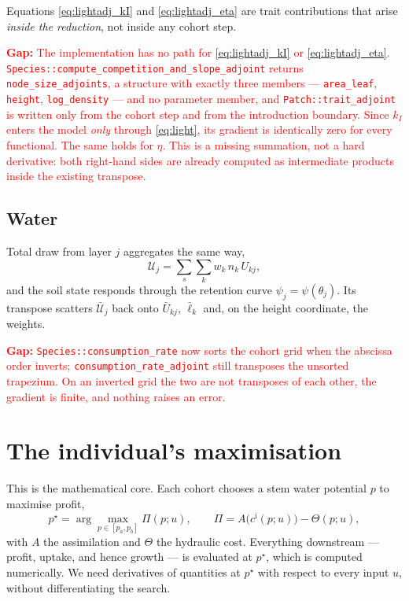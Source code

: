 \documentclass[11pt,a4paper]{article}
\newcommand{\code}[1]{\texttt{\small #1}}
\newcommand{\adj}[1]{\bar{#1}}
\newcommand{\gap}[1]{\textcolor{red}{\textbf{Gap:} #1}}
\begin{document}
Equations \eqref{eq:lightadj_kI} and \eqref{eq:lightadj_eta} are trait
contributions that arise \emph{inside the reduction}, not inside any cohort step.

\gap{The implementation has no path for \eqref{eq:lightadj_kI} or
\eqref{eq:lightadj_eta}. \code{Species::compute\_competition\_and\_slope\_adjoint}
returns \code{node\_size\_adjoints}, a structure with exactly three members ---
\code{area\_leaf}, \code{height}, \code{log\_density} --- and no parameter member,
and \code{Patch::trait\_adjoint} is written only from the cohort step and from the
introduction boundary. Since $k_I$ enters the model \emph{only} through
\eqref{eq:light}, its gradient is identically zero for every functional. The same
holds for $\eta$. This is a missing summation, not a hard derivative: both
right-hand sides are already computed as intermediate products inside the existing
transpose.}

\subsection{Water}

Total draw from layer $j$ aggregates the same way,
\begin{equation}
\mathcal{U}_j = \sum_s \sum_k w_k \, n_k \, U_{kj},
\label{eq:water}
\end{equation}
and the soil state responds through the retention curve
$\psi_j = \psi(\theta_j)$. Its transpose scatters $\adj{\mathcal{U}}_j$ back onto
$\adj U_{kj}$, $\adj \ell_k$ and, on the height coordinate, the weights.

\gap{\code{Species::consumption\_rate} now sorts the cohort grid when the
abscissa order inverts; \code{consumption\_rate\_adjoint} still transposes the
unsorted trapezium. On an inverted grid the two are not transposes of each other,
the gradient is finite, and nothing raises an error.}

\section{The individual's maximisation}
\label{sec:leaf}

This is the mathematical core. Each cohort chooses a stem water potential $p$ to
maximise profit,
\begin{equation}
p^\star = \arg\max_{p \in [p_a, p_b]} \Pi(p; u),
\qquad
\Pi = A\big(c^{\mathrm{i}}(p; u)\big) - \Theta(p; u),
\label{eq:argmax}
\end{equation}
with $A$ the assimilation and $\Theta$ the hydraulic cost. Everything downstream
--- profit, uptake, and hence growth --- is evaluated at $p^\star$, which is
computed numerically. We need derivatives of quantities at $p^\star$ with respect
to every input $u$, without differentiating the search.
\end{document}
